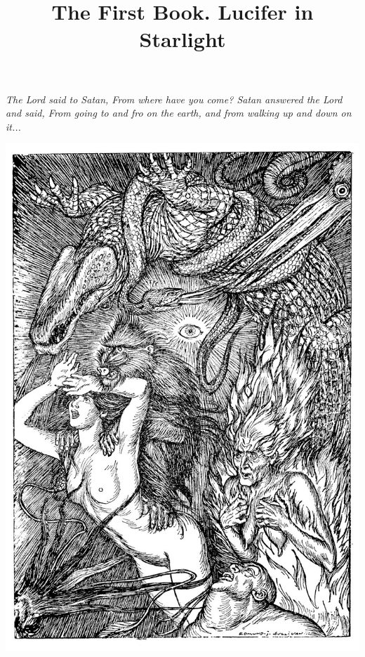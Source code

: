 \documentclass{amsbook}
\title{The First Book. Lucifer in Starlight}
\begin{document}
    \frontmatter
    \renewcommand\thefootnote{{}}
    \maketitle

    \thispagestyle{empty}
    \vspace*{\fill}
    \noindent \textit{The Lord said to Satan, From where have you come? Satan answered the Lord and said, From going to and fro on the earth, and from walking up and down on it...}
    \vspace*{\fill}
    \clearpage

    \tableofcontents

    \thispagestyle{empty}
    \vspace*{\fill}
    {\centering
    \includegraphics[width=\textwidth]{content/images/rubaiyat.jpg}}
    \vspace*{\fill}
    \clearpage
\end{document}
